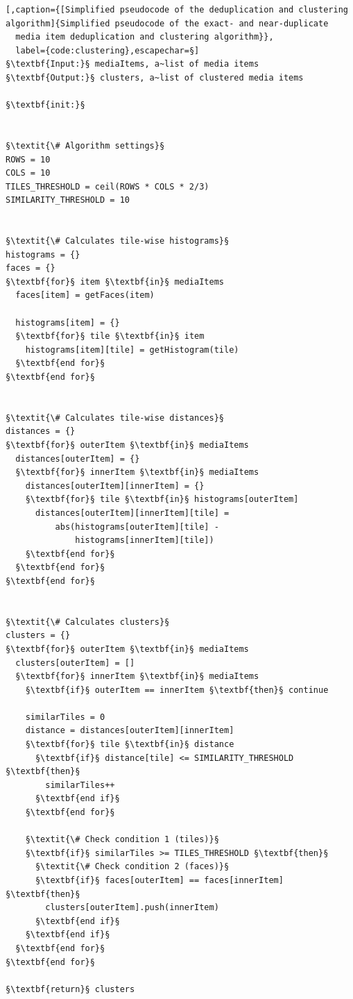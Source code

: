 \begin{lstlisting}[,caption={[Simplified pseudocode of the deduplication and clustering algorithm]{Simplified pseudocode of the exact- and near-duplicate
  media item deduplication and clustering algorithm}},
  label={code:clustering},escapechar=§]
§\textbf{Input:}§ mediaItems, a~list of media items
§\textbf{Output:}§ clusters, a~list of clustered media items

§\textbf{init:}§


§\textit{\# Algorithm settings}§
ROWS = 10
COLS = 10
TILES_THRESHOLD = ceil(ROWS * COLS * 2/3)
SIMILARITY_THRESHOLD = 10


§\textit{\# Calculates tile-wise histograms}§
histograms = {}
faces = {}
§\textbf{for}§ item §\textbf{in}§ mediaItems
  faces[item] = getFaces(item)

  histograms[item] = {}
  §\textbf{for}§ tile §\textbf{in}§ item
    histograms[item][tile] = getHistogram(tile)
  §\textbf{end for}§
§\textbf{end for}§


§\textit{\# Calculates tile-wise distances}§
distances = {}
§\textbf{for}§ outerItem §\textbf{in}§ mediaItems
  distances[outerItem] = {}
  §\textbf{for}§ innerItem §\textbf{in}§ mediaItems
    distances[outerItem][innerItem] = {}
    §\textbf{for}§ tile §\textbf{in}§ histograms[outerItem]
      distances[outerItem][innerItem][tile] =
          abs(histograms[outerItem][tile] -
              histograms[innerItem][tile])
    §\textbf{end for}§
  §\textbf{end for}§
§\textbf{end for}§


§\textit{\# Calculates clusters}§
clusters = {}
§\textbf{for}§ outerItem §\textbf{in}§ mediaItems
  clusters[outerItem] = []
  §\textbf{for}§ innerItem §\textbf{in}§ mediaItems
    §\textbf{if}§ outerItem == innerItem §\textbf{then}§ continue

    similarTiles = 0
    distance = distances[outerItem][innerItem]
    §\textbf{for}§ tile §\textbf{in}§ distance
      §\textbf{if}§ distance[tile] <= SIMILARITY_THRESHOLD §\textbf{then}§
        similarTiles++
      §\textbf{end if}§
    §\textbf{end for}§

    §\textit{\# Check condition 1 (tiles)}§
    §\textbf{if}§ similarTiles >= TILES_THRESHOLD §\textbf{then}§
      §\textit{\# Check condition 2 (faces)}§
      §\textbf{if}§ faces[outerItem] == faces[innerItem] §\textbf{then}§
        clusters[outerItem].push(innerItem)
      §\textbf{end if}§
    §\textbf{end if}§
  §\textbf{end for}§
§\textbf{end for}§

§\textbf{return}§ clusters
\end{lstlisting}

